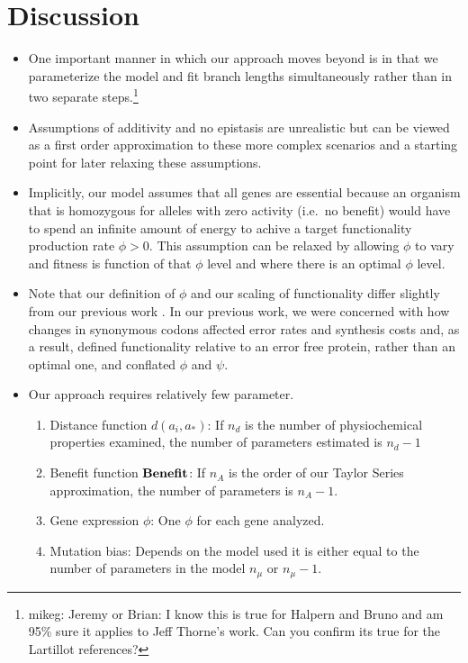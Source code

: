 \documentclass{article}
\newcommand{\Func}{\ensuremath{\text{\textbf{Benefit}}}\xspace}
\newcommand{\aopt}{\ensuremath{a_*}\xspace}
\begin{document}
\section*{Discussion}

\begin{itemize}
\item One important manner in which our approach moves beyond \citet{HalpernAndBruno1998,RobinsonEtAl2003,LartillotAndPhilippe2004,ThorneEtAl2012,RodrigueAndLartillot2014} is in that we parameterize the model and fit branch lengths simultaneously rather than in two separate steps.\footnote{mikeg: Jeremy or Brian: I know this is true for Halpern and Bruno and am 95\% sure it applies to Jeff Thorne's work.
Can you confirm its true for the Lartillot references?}
\item Assumptions of additivity and no epistasis are unrealistic but can be viewed as a first order approximation to these more complex scenarios and a starting point for later relaxing these assumptions.
\item Implicitly, our model assumes that all genes are essential because an organism that is homozygous for alleles with zero activity (i.e.~no benefit) would have to spend an infinite amount of energy to achive a target functionality production rate $\phi > 0$.
This assumption can be relaxed by allowing $\phi$ to vary and fitness is function of that $\phi$ level and where there is an optimal $\phi$ level.
\item Note that our definition of $\phi$ and our scaling of functionality differ slightly from our previous work \citep{Gilchrist2007,GilchristEtAl2009,ShahAndGilchrist2011,GilchristEtAl2015}.
In our previous work, we were concerned with how changes in synonymous codons affected error rates and synthesis costs and, as a result, defined functionality relative to an error free protein, rather than an optimal one, and conflated $\phi$ and $\psi$.
\item Our approach requires relatively few parameter. 
  \begin{enumerate}
  \item Distance function $d(a_i, \aopt)$: If $n_d$ is the number of physiochemical properties examined, the number of parameters estimated is $n_d - 1$
  \item Benefit function $\Func$: If $n_A$ is the order of our Taylor Series approximation, the number of parameters is $n_A-1$.
  \item Gene expression $\phi$: One $\phi$ for each gene analyzed.
  \item Mutation bias: Depends on the model used it is either equal to the number of parameters in the model $n_\mu$ or $n_\mu-1$.

\end{enumerate}
\end{itemize}
\end{document}
